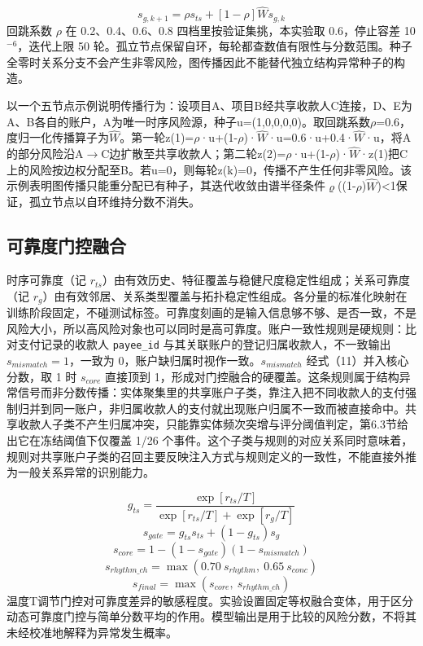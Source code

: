 \documentclass[a4paper,fleqn]{cas-dc}
\begin{document}
\begin{equation}
s_{g,k+1} = \rho s_{ts} + [1 - \rho]\hat{W}s_{g,k}
\end{equation}
回跳系数 $\rho$ 在 0.2、0.4、0.6、0.8 四档里按验证集挑，本实验取 0.6，停止容差 10$^{-6}$，迭代上限 50 轮。孤立节点保留自环，每轮都查数值有限性与分数范围。种子全零时关系分支不会产生非零风险，图传播因此不能替代独立结构异常种子的构造。

以一个五节点示例说明传播行为：设项目A、项目B经共享收款人C连接，D、E为A、B各自的账户，A为唯一时序风险源，种子u=(1,0,0,0,0)。取回跳系数$\rho$=0.6，度归一化传播算子为$\hat{W}$。第一轮z(1)=$\rho$·u+(1-$\rho$)·$\hat{W}$·u=0.6·u+0.4·$\hat{W}$·u，将A的部分风险沿A$\rightarrow$C边扩散至共享收款人；第二轮z(2)=$\rho$·u+(1-$\rho$)·$\hat{W}$·z(1)把C上的风险按边权分配至B。若u=0，则每轮z(k)=0，传播不产生任何非零风险。该示例表明图传播只能重分配已有种子，其迭代收敛由谱半径条件$\varrho$((1-$\rho$)$\hat{W}$)<1保证，孤立节点以自环维持分数不消失。

\subsection{可靠度门控融合}
时序可靠度（记 $r_{ts}$）由有效历史、特征覆盖与稳健尺度稳定性组成；关系可靠度（记 $r_g$）由有效邻居、关系类型覆盖与拓扑稳定性组成。各分量的标准化映射在训练阶段固定，不碰测试标签。可靠度刻画的是输入信息够不够、是否一致，不是风险大小，所以高风险对象也可以同时是高可靠度。账户一致性规则是硬规则：比对支付记录的收款人 \texttt{payee\_id} 与其关联账户的登记归属收款人，不一致输出 $s_{mismatch}=1$，一致为 0，账户缺归属时视作一致。$s_{mismatch}$ 经式（11）并入核心分数，取 1 时 $s_{core}$ 直接顶到 1，形成对门控融合的硬覆盖。这条规则属于结构异常信号而非分数传播：实体聚集里的共享账户子类，靠注入把不同收款人的支付强制归并到同一账户，非归属收款人的支付就出现账户归属不一致而被直接命中。共享收款人子类不产生归属冲突，只能靠实体频次突增与评分阈值判定，第6.3节给出它在冻结阈值下仅覆盖 1/26 个事件。这个子类与规则的对应关系同时意味着，规则对共享账户子类的召回主要反映注入方式与规则定义的一致性，不能直接外推为一般关系异常的识别能力。

\begin{equation}
g_{ts} = \frac{\exp[r_{ts}/T]}{\exp[r_{ts}/T] + \exp[r_{g}/T]}
\end{equation}
\begin{equation}
s_{gate} = g_{ts}s_{ts} + (1 - g_{ts})s_{g}
\end{equation}
\begin{equation}
s_{core} = 1 - (1 - s_{gate})(1 - s_{mismatch})
\end{equation}
\begin{equation}
s_{rhythm\_ch} = \max(0.70\ s_{rhythm},\ 0.65\ s_{conc})
\end{equation}
\begin{equation}
s_{final} = \max(s_{core},\ s_{rhythm\_ch})
\end{equation}
温度T调节门控对可靠度差异的敏感程度。实验设置固定等权融合变体，用于区分动态可靠度门控与简单分数平均的作用。模型输出是用于比较的风险分数，不将其未经校准地解释为异常发生概率。
\end{document}
